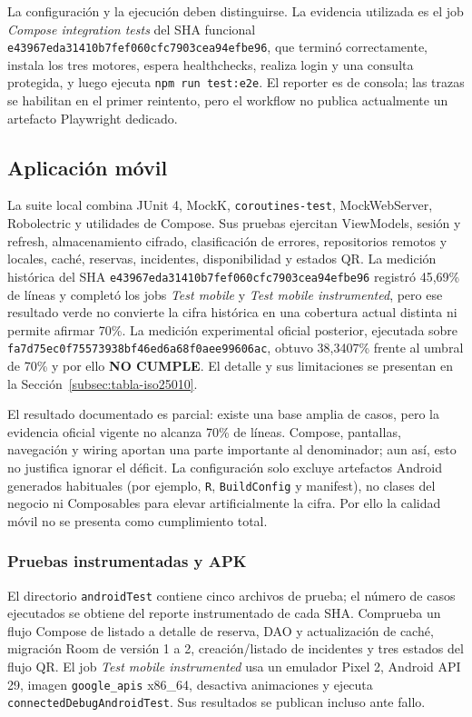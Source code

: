 La configuración y la ejecución deben distinguirse. La evidencia utilizada es
el job \emph{Compose integration tests} del SHA funcional
\texttt{e43967eda31410b7fef060cfc7903cea94efbe96}, que terminó correctamente,
instala los tres motores, espera healthchecks, realiza login y una consulta
protegida, y luego ejecuta \texttt{npm run test:e2e}. El reporter es de consola;
las trazas se habilitan en el primer reintento, pero el workflow no publica
actualmente un artefacto Playwright dedicado.

\subsection{Aplicación móvil}
\label{subsec:pruebas-mobile}

La suite local combina JUnit 4, MockK, \texttt{coroutines-test}, MockWebServer,
Robolectric y utilidades de Compose. Sus pruebas ejercitan
ViewModels, sesión y refresh, almacenamiento cifrado, clasificación de errores,
repositorios remotos y locales, caché, reservas, incidentes, disponibilidad y
estados QR. La medición histórica del SHA
\texttt{e43967eda31410b7fef060cfc7903cea94efbe96} registró 45,69\% de
líneas y completó los jobs
\emph{Test mobile} y \emph{Test mobile instrumented}, pero ese resultado verde
no convierte la cifra histórica en una cobertura actual distinta ni permite
afirmar 70\%. La medición experimental oficial posterior, ejecutada sobre
\texttt{fa7d75ec0f75573938bf46ed6a68f0aee99606ac}, obtuvo 38,3407\%
frente al umbral de 70\% y por ello \textbf{NO CUMPLE}. El detalle y sus
limitaciones se presentan en la Sección~\ref{subsec:tabla-iso25010}.

El resultado documentado es parcial: existe una base amplia de casos, pero la
evidencia oficial vigente no alcanza 70\% de líneas. Compose, pantallas,
navegación y wiring
aportan una parte importante al denominador; aun así, esto no justifica ignorar
el déficit. La configuración solo excluye artefactos Android generados habituales
(por ejemplo, \texttt{R}, \texttt{BuildConfig} y manifest), no clases del
negocio ni Composables para elevar artificialmente la cifra. Por ello la calidad
móvil no se presenta como cumplimiento total.

\subsubsection{Pruebas instrumentadas y APK}

El directorio \texttt{androidTest} contiene cinco archivos de prueba; el número
de casos ejecutados se obtiene del reporte instrumentado de cada SHA.
Comprueba un flujo Compose de listado a detalle de reserva, DAO y actualización
de caché, migración Room de versión 1 a 2, creación/listado de incidentes y tres
estados del flujo QR. El job \emph{Test mobile instrumented} usa un emulador
Pixel 2, Android API 29, imagen \texttt{google\_apis} x86\_64, desactiva
animaciones y ejecuta \texttt{connectedDebugAndroidTest}. Sus resultados se
publican incluso ante fallo.

